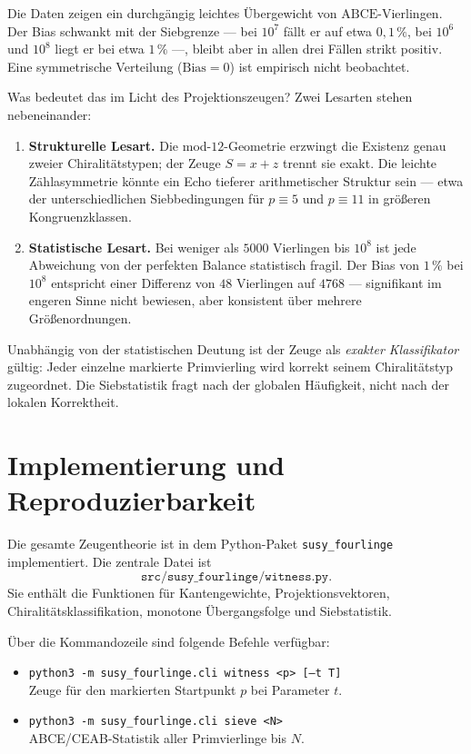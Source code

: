 \documentclass[11pt,a4paper]{article}
\theoremstyle{definition}
\theoremstyle{plain}
\begin{document}
	Die Daten zeigen ein durchgängig leichtes Übergewicht von $\mathrm{ABCE}$-Vierlingen. Der Bias schwankt mit der Siebgrenze --- bei $10^7$ fällt er auf etwa $0{,}1\,\%$, bei $10^6$ und $10^8$ liegt er bei etwa $1\,\%$ ---, bleibt aber in allen drei Fällen strikt positiv. Eine symmetrische Verteilung ($\mathrm{Bias}=0$) ist empirisch nicht beobachtet.
	
	Was bedeutet das im Licht des Projektionszeugen? Zwei Lesarten stehen nebeneinander:
	
	\begin{enumerate}[label=\alph*)]
		\item \textbf{Strukturelle Lesart.} Die mod-$12$-Geometrie erzwingt die Existenz genau zweier Chiralitätstypen; der Zeuge $S=x+z$ trennt sie exakt. Die leichte Zählasymmetrie könnte ein Echo tieferer arithmetischer Struktur sein --- etwa der unterschiedlichen Siebbedingungen für $p\equiv 5$ und $p\equiv 11$ in größeren Kongruenzklassen.
		\item \textbf{Statistische Lesart.} Bei weniger als $5000$ Vierlingen bis $10^8$ ist jede Abweichung von der perfekten Balance statistisch fragil. Der Bias von $1\,\%$ bei $10^8$ entspricht einer Differenz von $48$ Vierlingen auf $4768$ --- signifikant im engeren Sinne nicht bewiesen, aber konsistent über mehrere Größenordnungen.
	\end{enumerate}
	
	Unabhängig von der statistischen Deutung ist der Zeuge als \emph{exakter Klassifikator} gültig: Jeder einzelne markierte Primvierling wird korrekt seinem Chiralitätstyp zugeordnet. Die Siebstatistik fragt nach der globalen Häufigkeit, nicht nach der lokalen Korrektheit.
	
	\section{Implementierung und Reproduzierbarkeit}
	
	Die gesamte Zeugentheorie ist in dem Python-Paket \texttt{susy\_fourlinge} implementiert. Die zentrale Datei ist
	\[
	\texttt{src/susy\_fourlinge/witness.py}.
	\]
	Sie enthält die Funktionen für Kantengewichte, Projektionsvektoren, Chiralitätsklassifikation, monotone Übergangsfolge und Siebstatistik.
	
	Über die Kommandozeile sind folgende Befehle verfügbar:
	\begin{itemize}
		\item \texttt{python3 -m susy\_fourlinge.cli witness <p> [--t T]}\\
		Zeuge für den markierten Startpunkt $p$ bei Parameter $t$.
		\item \texttt{python3 -m susy\_fourlinge.cli sieve <N>}\\
		ABCE/CEAB-Statistik aller Primvierlinge bis $N$.
	\end{itemize}
	
\end{document}
